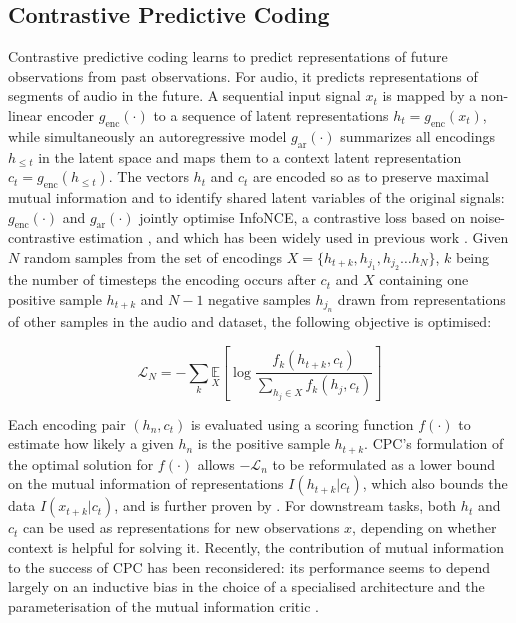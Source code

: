 \subsection{Contrastive Predictive Coding}\label{sec:cpc}
Contrastive predictive coding learns to predict representations of future observations from past observations. For audio, it predicts representations of segments of audio in the future. A sequential input signal $x_t$ is mapped by a non-linear encoder $g_{\mathrm{enc}}(\cdot)$ to a sequence of latent representations $h_t = g_{\mathrm{enc}}(x_t)$, while simultaneously an autoregressive model $g_{\mathrm{ar}}(\cdot)$ summarizes all encodings $h_{\leq t}$ in the latent space and maps them to a context latent representation $c_t = g_{\mathrm{enc}}(h_{\leq t})$. The vectors $h_t$ and $c_t$ are encoded so as to preserve maximal mutual information and to identify shared latent variables of the original signals: $g_{\mathrm{enc}}(\cdot)$ and $g_{\mathrm{ar}}(\cdot)$ jointly optimise InfoNCE, a contrastive loss based on noise-contrastive estimation \cite{gutmann_noise-contrastive_nodate}, and which has been widely used in previous work \cite{oord_representation_2019, sohn2020fixmatch, chen_simple_2020}. Given $N$ random samples from the set of encodings $X = \{h_{t+k}, h_{j_1}, h_{j_2} \hdots h_N\}$, $k$ being the number of timesteps the encoding occurs after $c_t$ and $X$ containing one positive sample $h_{t+k}$ and $N-1$ negative samples $h_{j_{n}}$ drawn from representations of other samples in the audio and dataset, the following objective is optimised:

\begin{equation}
    \mathcal{L}_{N}=-\sum_{k} \underset{X}{\mathbb{E}}\left[\log \frac{f_{k}\left(h_{t+k}, c_{t}\right)}{\sum_{h_{j} \in X} f_{k}\left(h_{j}, c_{t}\right)}\right]
\end{equation}

Each encoding pair $(h_n, c_t)$ is evaluated using a scoring function $f(\cdot)$ to estimate how likely a given $h_n$ is the positive sample $h_{t+k}$. CPC's formulation of the optimal solution for $f(\cdot)$ allows $-\mathcal{L}_n$ to be reformulated as a lower bound on the mutual information of representations $I(h_{t+k} | c_t)$, which also bounds the data $I(x_{t+k} | c_t)$, and is further proven by \cite{poole_variational_2019}. For downstream tasks, both $h_t$ and $c_t$ can be used as representations for new observations $x$, depending on whether context is helpful for solving it. Recently, the contribution of mutual information to the success of CPC has been reconsidered: its performance seems to depend largely on an inductive bias in the choice of a specialised architecture and the parameterisation of the mutual information critic \cite{Tschannen2020OnMI}.

